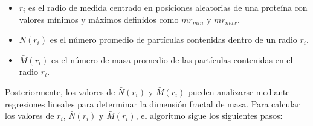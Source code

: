 \begin{itemize}
	\item \(r_i\) es el radio de medida centrado en posiciones aleatorias de una prote\'{i}na con valores m\'{i}nimos y m\'{a}ximos definidos como \(mr_{min}\) y \(mr_{max}\).
	\item \( \bar{N}(r_i)\) es el número promedio de partículas contenidas dentro de un radio \(r_i\). 
	\item  \( \bar{M}(r_i)\) es el n\'{u}mero de masa promedio de las part\'{i}culas contenidas en el radio \(r_i\).
\end{itemize}








Posteriormente, los valores de \( \bar{N}(r_i) \) y \( \bar{M}(r_i)\) pueden analizarse mediante regresiones lineales para determinar la dimensi\'{o}n fractal de masa. Para calcular los valores de \(r_i\), \( \bar{N}(r_i)\) y \( \bar{M}(r_i)\), el algoritmo sigue los siguientes pasos:


